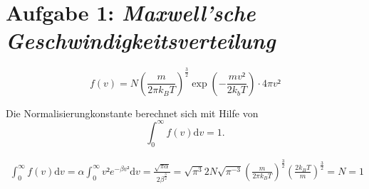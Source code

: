  
\section*{Aufgabe 1: \emph{Maxwell'sche Geschwindigkeitsverteilung}}

\begin{equation}
f(v)=N\left(\frac{m}{2\pi k_BT}\right)^\frac{3}{2}\exp{\left(-\frac{mv²}{2k_bT}\right)}\cdot4\pi v²
\end{equation}

Die Normalisierungkonstante berechnet sich mit Hilfe von
\begin{equation*}
\int_{0}^\infty f(v)\text{d}v=1.
\end{equation*}

\begin{align*}
\int_{0}^\infty f(v)\text{d}v= \alpha\int_{0}^\infty v²e^{-\beta v²}\text{d}v = \frac{\sqrt{\pi\alpha}}{2\beta^\frac{3}{2}}=
\sqrt{\pi^3} 2  N \sqrt{\pi^{-3}}\left(\frac{m}{2\pi k_B T}\right)^\frac{3}{2}\left(\frac{2k_B T}{m}\right)^\frac{3}{2}=N=1
\end{align*}


